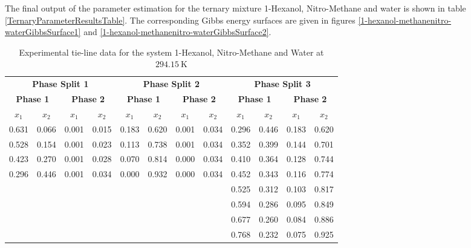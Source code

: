 The final output of the parameter estimation for the ternary mixture 1-Hexanol, Nitro-Methane and water is shown in table \ref{TernaryParameterResultsTable}. The corresponding Gibbs energy surfaces are given in figures \ref{1-hexanol-methanenitro-waterGibbsSurface1} and \ref{1-hexanol-methanenitro-waterGibbsSurface2}.\\

\begin{table}[hp]
\caption{Experimental tie-line data for the system 1-Hexanol, Nitro-Methane and Water at $294.15~\mathrm{K}$}
\begin{tabular}{cccccccccccc}
\toprule
\multicolumn{4}{c}{\textbf{Phase Split 1}} & \multicolumn{4}{c}{\textbf{Phase Split 2}} & \multicolumn{4}{c}{\textbf{Phase Split 3}}\\
\multicolumn{2}{c}{\textbf{Phase 1}} & \multicolumn{2}{c}{\textbf{Phase 2}} &\multicolumn{2}{c}{\textbf{Phase 1}} & \multicolumn{2}{c}{\textbf{Phase 2}} & \multicolumn{2}{c}{\textbf{Phase 1}} & \multicolumn{2}{c}{\textbf{Phase 2}}\\
$x_{1}$& $x_{2}$ &$x_{1}$& $x_{2}$ &$x_{1}$& $x_{2}$ &$x_{1}$& $x_{2}$ &$x_{1}$& $x_{2}$ &$x_{1}$& $x_{2}$ \\
\midrule
0.631 & 0.066& 0.001 & 0.015 & 0.183 & 0.620 &0.001 & 0.034& 0.296 & 0.446 & 0.183 & 0.620\\
0.528 & 0.154& 0.001 & 0.023 & 0.113 & 0.738 &0.001 & 0.034& 0.352 & 0.399 & 0.144 & 0.701\\
0.423 & 0.270& 0.001 & 0.028 & 0.070 & 0.814 &0.000 & 0.034& 0.410 & 0.364 & 0.128 & 0.744\\
0.296 & 0.446& 0.001 & 0.034 & 0.000 & 0.932 &0.000 & 0.034& 0.452 & 0.343 & 0.116 & 0.774\\
 & & & & & & & & 0.525 & 0.312 & 0.103 & 0.817\\
 & & & & & & & & 0.594 & 0.286 & 0.095 & 0.849\\
 & & & & & & & & 0.677 & 0.260 & 0.084 & 0.886\\
 & & & & & & & & 0.768 & 0.232 & 0.075 & 0.925\\
\bottomrule
\end{tabular}\\
\label{TielineData1-hexanol-methanenitro-water1}
\end{table}

